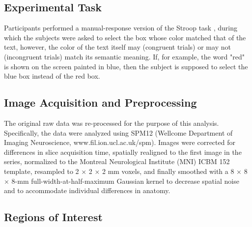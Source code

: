 \documentclass[10pt,letterpaper]{article}
\begin{document}
\subsection{Experimental Task}

Participants performed a manual-response version of the Stroop task \cite{Stroop1935}, during which the subjects were asked to select the box whose color matched that of the text, however, the color of the text itself may (congruent trials) or may not (incongruent trials) match its semantic meaning. If, for example, the word "red" is shown on the screen painted in blue, then the subject is supposed to select the blue box instead of the red box.

\subsection{Image Acquisition and Preprocessing}

The original raw data was re-processed for the purpose of this analysis. Specifically, the data were analyzed using SPM12 (Wellcome Department of Imaging Neuroscience, www.fil.ion.ucl.ac.uk/spm). Images were corrected for differences in slice acquisition time, spatially realigned to the first image in the series, normalized to the Montreal Neurological Institute (MNI) ICBM 152 template, resampled to 2 × 2 × 2 mm voxels, and finally smoothed with a 8 × 8 × 8-mm full-width-at-half-maximum Gaussian kernel to decrease spatial noise and to accommodate individual differences in anatomy. %

\subsection{Regions of Interest}
\end{document}
